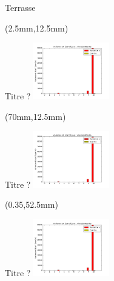 \documentclass[10pt]{beamer}
\begin{document}
	\begin{frame}{Terrasse}
		\begin{textblock*}{60mm}(2.5mm,12.5mm)
			\begin{block}{Titre ?}
				\includegraphics[width=125px]{../src/data/itinary_2/var_ecart_sat_x.png}
			\end{block}
		\end{textblock*}

		\begin{textblock*}{60mm}(70mm,12.5mm)
			\begin{block}{Titre ?}
				\includegraphics[width=125px]{../src/data/itinary_2/var_ecart_sat_x.png}
			\end{block}
		\end{textblock*}

		\begin{textblock*}{60mm}(0.35\textwidth,52.5mm)
			\begin{block}{Titre ?}
				\includegraphics[width=125px]{../src/data/itinary_2/var_ecart_sat_x.png}
			\end{block}
		\end{textblock*}
	\end{frame}
\end{document}
